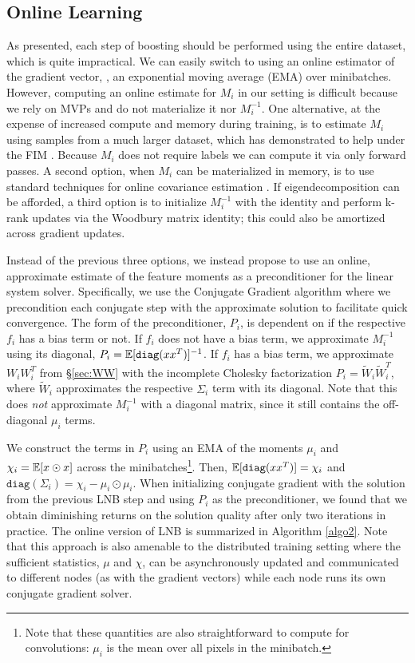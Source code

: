 \subsection{Online Learning}
\label{sec:online}
As presented, each step of boosting should be performed using the entire dataset,
which is quite impractical. We can easily switch to using an online estimator
of the gradient vector, \eg, an exponential moving average (EMA) over minibatches.
However, computing an online estimate for $M_i$ in our setting is difficult because we
rely on MVPs and do not materialize it nor $M_i^{-1}$.
One alternative, at the expense of increased compute and memory during training,
is to estimate $M_i$ using samples from a much larger dataset, which has demonstrated
to help under the FIM \citep{pascanu-2014}. Because $M_i$ does not require labels
we can compute it via only forward passes.
A second option, when $M_i$ can be materialized in memory, is to use standard techniques for
online covariance estimation \citep{dasgupta}.
If eigendecomposition can be afforded, a third option is to initialize $M_i^{-1}$ with the identity and
perform k-rank updates via the Woodbury matrix identity; this could also be amortized across gradient updates.

Instead of the previous three options, we instead propose to use an online, approximate
estimate of the feature moments as a preconditioner for the linear system solver.
Specifically, we use the Conjugate Gradient algorithm where we precondition each conjugate
step with the approximate solution to facilitate quick convergence.
The form of the preconditioner, $P_i$, is dependent on if the respective $f_i$ has a bias term or not.
If $f_i$ does not have a bias term, we approximate $M_i^{-1}$ using its diagonal,
$P_i = \mathbb{E}[\texttt{diag}(xx^T)]^{-1}$. If $f_i$ has a bias term, 
we approximate $W_iW_i^T$ from \S \ref{sec:WW} with the incomplete Cholesky factorization
$P_i = \widetilde{W}_i\widetilde{W}_i^T$, where $\widetilde{W}_i$ approximates the respective $\Sigma_i$ term with its diagonal.
Note that this does \emph{not} approximate $M_i^{-1}$ with a diagonal matrix, since it still contains the
off-diagonal $\mu_i$ terms.

We construct the terms in $P_i$ using an EMA of the moments $\mu_i$ and $\chi_i = \mathbb{E}[x \odot x]$
across the minibatches\footnote{Note that these quantities are also straightforward to compute for convolutions:
$\mu_i$ is the mean over all pixels in the minibatch.}.
Then, $\mathbb{E}[\texttt{diag}(xx^T)] = \chi_i$ and
$\texttt{diag}(\Sigma_i)= \chi_i - \mu_i \odot \mu_i$.
When initializing conjugate gradient with the solution from the previous LNB step and using 
$P_i$ as the preconditioner, we found that we obtain diminishing returns
on the solution quality after only two iterations in practice. The online version of LNB is
summarized in Algorithm \ref{algo2}. Note that this approach is also amenable to the distributed
training setting where the sufficient statistics, $\mu$ and $\chi$, can be asynchronously updated and communicated
to different nodes (as with the gradient vectors) while each node runs its own conjugate gradient solver.

